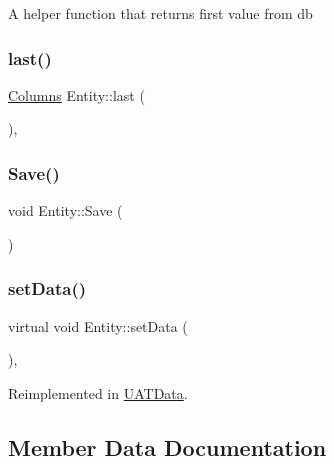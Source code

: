 A helper function that returns first value from db \mbox{\label{classEntity_a55872541f5b73a8cef49eda0368c770c}} 
\subsubsection{\texorpdfstring{last()}{last()}}
{\footnotesize\ttfamily \mbox{\hyperlink{classColumns}{Columns}} Entity\+::last (\begin{DoxyParamCaption}{ }\end{DoxyParamCaption})\hspace{0.3cm}{\ttfamily [inline]}, {\ttfamily [protected]}}

\mbox{\label{classEntity_adb45cf2a74f4ce58b340b70e1727c8e5}} 
\subsubsection{\texorpdfstring{Save()}{Save()}}
{\footnotesize\ttfamily void Entity\+::\+Save (\begin{DoxyParamCaption}{ }\end{DoxyParamCaption})\hspace{0.3cm}{\ttfamily [inline]}}

\mbox{\label{classEntity_a0f8088e06ee1aae86e0a8049e371692f}} 
\subsubsection{\texorpdfstring{set\+Data()}{setData()}}
{\footnotesize\ttfamily virtual void Entity\+::set\+Data (\begin{DoxyParamCaption}{ }\end{DoxyParamCaption})\hspace{0.3cm}{\ttfamily [inline]}, {\ttfamily [virtual]}}



Reimplemented in \mbox{\hyperlink{classUATData_a969aa1661ec27cd3b85999fc61403a0e}{U\+A\+T\+Data}}.



\subsection{Member Data Documentation}
\mbox{\label{classEntity_a7492e529485203a402122b8f3e09dfb6}} 
